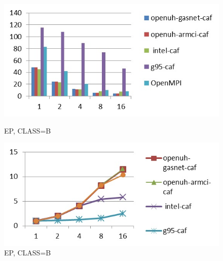 \begin{figure}[ht]
\begin{minipage}[b]{0.45\linewidth}
\centering
\includegraphics[width=\textwidth]{./figures/ep_B_time.jpg}
\caption{EP, CLASS=B}
\label{fig:figure1}
\end{minipage}
\hspace{0.5cm}
\begin{minipage}[b]{0.45\linewidth}
\centering
\includegraphics[width=\textwidth]{./figures/ep_B_scalability.jpg}
\caption{EP, CLASS=B}
\label{fig:figure2}
\end{minipage}
\end{figure}


